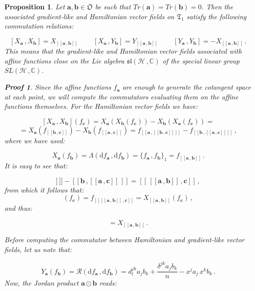 \documentclass[11pt]{article}
\newcommand{\be}{\begin{equation}}
\newcommand{\ee}{\end{equation}}
\newcommand{\obsp}{\mathfrak{O}}
\newtheorem{prop}{Proposition}
\newtheorem*{pf}{Proof}
\begin{document}
\begin{prop}
Let $\mathbf{a},\mathbf{b}\in\obsp$ be such that $Tr(\mathbf{a})=Tr(\mathbf{b})=0$.
Then the associated gradient-like and Hamiltonian vector fields on $\mathfrak{T}_{1}$ satisfy the following commutation relations:

\be\label{eqn: commutation relations on trace 1 hamiltonian and gradient-like vector fields}
[X_{\mathbf{a}}\,,X_{\mathbf{b}}]=X_{[[\mathbf{a}\,,\mathbf{b}]]}\;\;\;\;\;\;\;\;[X_{\mathbf{a}}\,,Y_{\mathbf{b}}]=Y_{[[\mathbf{a}\,,\mathbf{b}]]}\;\;\;\;\;\;\;\;[Y_{\mathbf{a}}\,,Y_{\mathbf{b}}]=-X_{[[\mathbf{a}\,,\mathbf{b}]]}\,.
\ee
This means that the gradient-like and Hamiltonian vector fields associated with affine functions close on the Lie algebra $\mathfrak{sl}(\mathcal{H}\,,\mathbb{C})$ of the special linear group $SL(\mathcal{H}\,,\mathbb{C})$.


\begin{pf}
Since the affine functions $f_{\mathbf{a}}$ are enough to generate the cotangent space at each point, we will compute the commutators evaluating them on the affine functions themselves.
For the Hamiltonian vector fields we have:

$$
[X_{\mathbf{a}}\,,X_{\mathbf{b}}](f_{\mathbf{c}})=X_{\mathbf{a}}(X_{\mathbf{b}}(f_{\mathbf{c}})) - X_{\mathbf{b}}(X_{\mathbf{a}}(f_{\mathbf{c}}))= 
$$
$$
=X_{\mathbf{a}}(f_{[[\mathbf{b}\,,\mathbf{c}]]}) - X_{\mathbf{b}}(f_{[[\mathbf{a}\,,\mathbf{c}]]})=f_{[[\mathbf{a}\,,[[\mathbf{b}\,,\mathbf{c}]]]]} - f_{[[\mathbf{b}\,,[[\mathbf{a}\,,\mathbf{c}]]]]}\,,
$$
where we have used:

\be
X_{\mathbf{a}}(f_{\mathbf{b}})=\Lambda(\mathrm{d}f_{\mathbf{a}}\,,\mathrm{d}f_{\mathbf{b}})=\{f_{\mathbf{a}}\,,f_{\mathbf{b}}\}_{1}=f_{[[\mathbf{a}\,,\mathbf{b}]]}\,.
\ee
It is easy to see that:

\be
[[\mathbf{a}\,,[[\mathbf{b}\,,\mathbf{c}]]\,]] - [[\mathbf{b}\,,[[\mathbf{a}\,,\mathbf{c}]]\,]]=[[\,[[\mathbf{a}\,,\mathbf{b}]]\,,\mathbf{c}]]\,,
\ee
from which it follows that:
\be
[X_{\mathbf{a}}\,,X_{\mathbf{b}}](f_{\mathbf{c}})=f_{[[[[\mathbf{a}\,,\mathbf{b}]]\,,\mathbf{c}]]}=X_{[[\mathbf{a}\,,\mathbf{b}]]}(f_{\mathbf{c}})\,,
\ee
and thus:

\be
[X_{\mathbf{a}}\,,X_{\mathbf{b}}]=X_{[[\mathbf{a}\,,\mathbf{b}]]}\,.
\ee

Before computing the commutator between Hamiltonian and gradient-like vector fields, let us note that:

\be\label{eqn: gradient-like action on affine functions}
Y_{\mathbf{a}}(f_{\mathbf{b}})=\mathcal{R}(\mathrm{d}f_{\mathbf{a}}\,,\mathrm{d}f_{\mathbf{b}})=d^{jk}_{l}a_{j}b_{k} + \frac{\delta^{jk}a_{j}b_{k}}{n} -  x^{j}a_{j}\,x^{k}b_{k} \,.
\ee
Now, the Jordan product $\mathbf{a}\odot\mathbf{b}$ reads:


\end{pf}
\end{prop}
\end{document}
